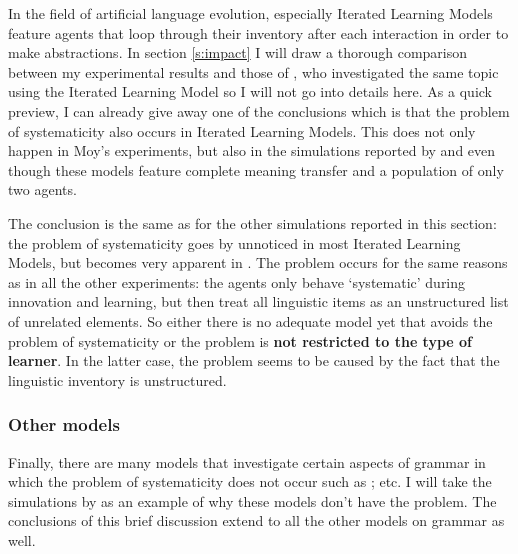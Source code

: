 In the field of artificial language evolution, especially Iterated Learning Models feature agents that loop through their inventory after each interaction in order to make abstractions. In section \ref{s:impact} I will draw a thorough comparison between my experimental results and those of \citet{moy06case}, who investigated the same topic using the Iterated Learning Model so I will not go into details here. As a quick preview, I can already give away one of the conclusions which is that the problem of systematicity also occurs in Iterated Learning Models. This does not only happen in Moy's experiments, but also in the simulations reported by \citet{kirby00syntax} and \citet{smith03iterated} even though these models feature complete meaning transfer and a population of only two agents.

The conclusion is the same as for the other simulations reported in this section: the problem of systematicity goes by unnoticed in most Iterated Learning Models, but becomes very apparent in \citet{moy06case}. The problem occurs for the same reasons as in all the other experiments: the agents only behave `systematic' during innovation and learning, but then treat all linguistic items as an unstructured list of unrelated elements. So either there is no adequate model yet that avoids the problem of systematicity or the problem is {\bfseries not restricted to the type of learner}. In the latter case, the problem seems to be caused by the fact that the linguistic inventory is unstructured.


\subsubsection{Other models}
 Finally, there are many models that investigate certain aspects of grammar in which the problem of systematicity does not occur such as \citet{debeule07compositionality, debeule06emergence, nowak99evolution, steels06how-grammar}; etc. I will take the simulations by \citet{debeule06emergence} as an example of why these models don't have the problem. The conclusions of this brief discussion extend to all the other models on grammar as well.


